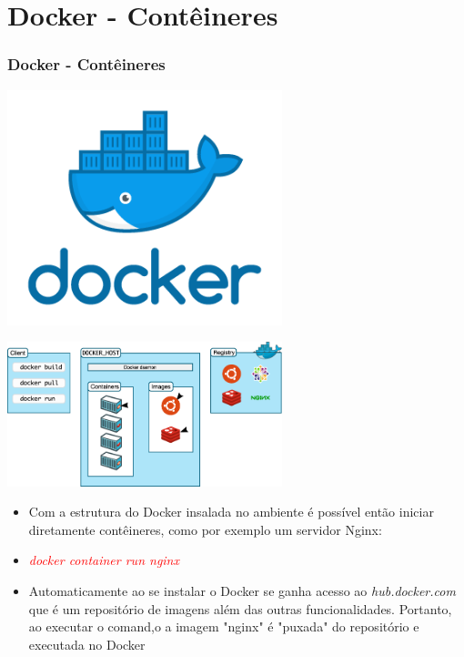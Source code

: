\documentclass[10pt]{beamer}
\theoremstyle{remark}
\theoremstyle{definition}
\newcommand{\code}[1]{\textcolor{red} {\textit{#1}}} %
\begin{document}
\section{Docker - Contêineres}
\begin{frame}[allowframebreaks]
\frametitle{Docker - Contêineres}
		
	\begin{center}
		\includegraphics[width=0.6\textwidth]{images/04.png}
	\end{center}
	
	\framebreak
	
	\begin{center}
		\includegraphics[width=0.6\textwidth]{images/01.png}
	\end{center}	
	
	\framebreak
	
\begin{itemize}
	\item 	Com a estrutura do Docker insalada no ambiente é possível então iniciar diretamente contêineres, como por exemplo um servidor Nginx:
	
	\item \code{docker container run nginx}

	\item Automaticamente ao se instalar o Docker se ganha acesso ao \textit{hub.docker.com} que é um repositório de imagens além das outras funcionalidades. Portanto, ao executar o comand,o a imagem "nginx" é "puxada" do repositório e executada no Docker
\end{itemize}
	

\end{frame}
\end{document}
